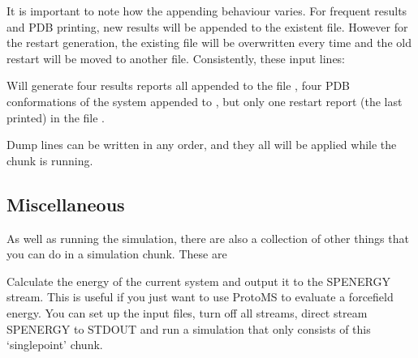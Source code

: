 \documentclass[letterpaper,10pt,english]{sphinxmanual}
\begin{document}
It is important to note how the appending behaviour varies. For frequent results and PDB printing, new results will be appended to the existent file. However for the restart generation, the existing file will be overwritten every time and the old restart will be moved to another file. Consistently, these input lines:

%
\begin{sphinxVerbatim}[commandchars=\\\{\}]
    
    
    
   
     
\end{sphinxVerbatim}

Will generate four results reports all appended to the file , four PDB conformations of the system appended to , but only one restart report (the last printed) in the file .

Dump lines can be written in any order, and they all will be applied while the  chunk is running.


\subsection{Miscellaneous}
\label{\detokenize{protoms:miscellaneous}}\label{\detokenize{protoms:misccmd}}
As well as running the simulation, there are also a collection of other things that you can do in a simulation chunk. These are

\ignorespaces 
\def\sphinxLiteralBlockLabel{\label{\detokenize{protoms:index-82}}}
%
\begin{sphinxVerbatim}[commandchars=\\\{\}]
 
\end{sphinxVerbatim}

Calculate the energy of the current system and output it to the SPENERGY stream. This is useful if you just want to use ProtoMS to evaluate a forcefield energy. You can set up the input files, turn off all streams, direct stream SPENERGY to STDOUT and run a simulation that only consists of this ‘singlepoint’ chunk.
\end{document}
